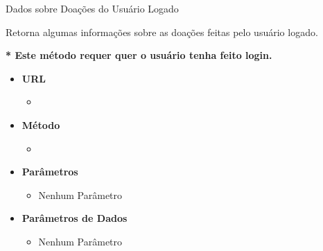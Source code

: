 
\begin{caixa}{Dados sobre Doações do Usuário Logado}{}

Retorna algumas informações sobre as doações feitas pelo usuário logado.

\textbf{* Este método requer quer o usuário tenha feito login.}

\begin{itemize}
\item \textbf{URL}
	\begin{itemize}
		\item {}
	\end{itemize}

\item \textbf{Método}
	\begin{itemize}
		\item {}
	\end{itemize}

\item \textbf{Parâmetros}
	\begin{itemize}
        \item Nenhum Parâmetro
	\end{itemize}

\item \textbf{Parâmetros de Dados}
	\begin{itemize}
		\item Nenhum Parâmetro
	\end{itemize}


\end{itemize}
\end{caixa}
